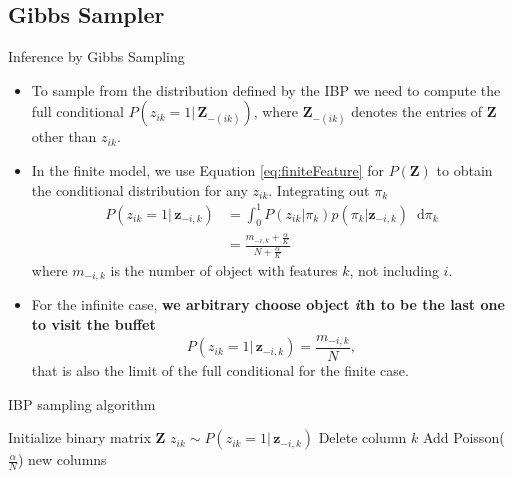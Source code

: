 \documentclass[aspectratio=169,xcolor=dvipsnames]{beamer}
\newcommand*\diff{\mathop{}\!\mathrm{d}}
\newcommand{\vecz}{\textbf{z}}
\newcommand{\matz}{\textbf{Z}}
\newcommand{\aOverK}{\frac{\alpha}{K}}
\begin{document}
\subsection{Gibbs Sampler}
\begin{frame}{Inference by Gibbs Sampling}
\setlength{\leftmargini}{0.2cm}
\begin{itemize}[<+->]
\item To sample from the distribution defined by the IBP we need to compute the full conditional $P(z_{ik}=1 | \, \matz_{-(ik)})$, where $\matz_{-(ik)}$ denotes the entries of $\matz$ other than $z_{ik}$.
\item In the finite model, we use Equation \ref{eq:finiteFeature} for $P(\matz)$ to obtain the conditional distribution for any $z_{ik}$. Integrating out $\pi_k$
\begin{align*}
    P(z_{ik}=1|\, \vecz_{-i,k}) &= \int_{0}^{1}P(z_{ik}|\pi_k)p(\pi_k|\vecz_{-i,k}) \diff \pi_k \\ &=\frac{m_{-i,k}+\aOverK}{N+\aOverK}
\end{align*}
where $m_{-i,k}$  is the number of object with features $k$, not including $i$.
\item For the infinite case, \textbf{we arbitrary choose object \textit{i}th to be the last one to visit the buffet}
\begin{equation}
    P(z_{ik}=1|\, \vecz_{-i,k}) =\frac{m_{-i,k}}{N}, \label{eq:IBPGibbs}
\end{equation}
that is also the limit of the full conditional for the finite case.
\end{itemize}
\end{frame}
\begin{frame}{IBP sampling algorithm}
\begin{algorithm}[H]
\begin{algorithmic}[1]
    \STATE Initialize binary matrix $\matz$
    \STATE $z_{ik} \sim P(z_{ik}=1|\, \vecz_{-i,k})$
    \ELSE 
    \STATE Delete column $k$
    \ENDIF
    \STATE Add Poisson($\frac{\alpha}{N}$) new columns
    \ENDFOR
    \ENDFOR
    \end{algorithmic}
    \caption{Gibbs sampler for IBP}
    \label{alg:seq}
    \end{algorithm}
\end{frame}
\end{document}
